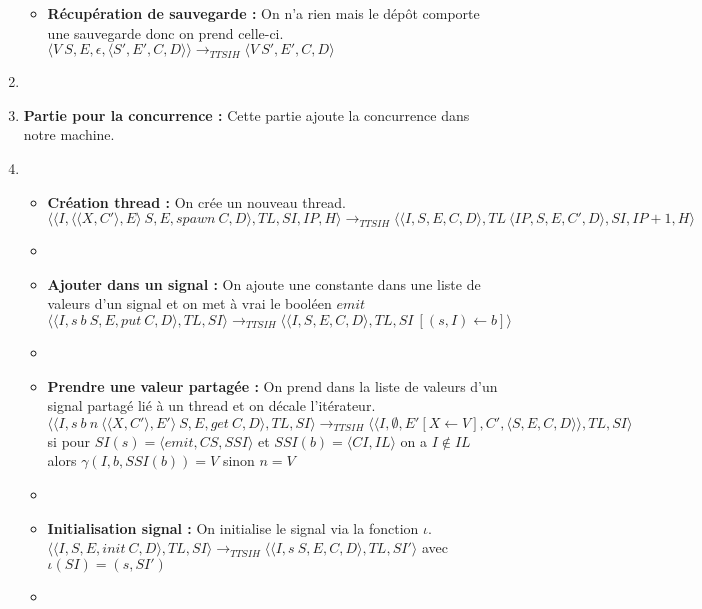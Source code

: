 \documentclass[10pt,a4paper]{report}
\begin{document}
\begin{enumerate}
\begin{itemize}
			\item[] \textbf{Récupération de sauvegarde :}  On n'a rien mais le dépôt comporte une sauvegarde donc on prend celle-ci.
			\smallbreak  
			$\langle V~S,E,\epsilon,\langle S',E',C,D\rangle\rangle
			\longrightarrow_{TTSIH} 
			\langle V~S',E',C,D\rangle$
		\end{itemize}
		\item[]
		
		
		
		\item[] \textbf{Partie pour la concurrence :} Cette partie ajoute la concurrence dans notre machine. 
		\item[]
		\begin{itemize}
			\item[]  \textbf{Création thread :} On crée un nouveau thread.
			\smallbreak 
			$\langle\langle I,\langle\langle X,C'\rangle, E\rangle~S,E,spawn~C,D\rangle,TL,SI,IP,H\rangle 
			\longrightarrow_{TTSIH} 
			\langle\langle I,S,E,C,D\rangle,TL~\langle IP,S,E,C',D\rangle,SI,IP+1,H\rangle$
			\item[]
			
			\item[] \textbf{Ajouter dans un signal :} On ajoute une constante dans une liste de valeurs d'un signal et on met à vrai le booléen $emit$
			\smallbreak
			$\langle\langle I,s~b~S,E,put~C,D\rangle,TL,SI\rangle
			\longrightarrow_{TTSIH} 
			\langle\langle I,S,E,C,D\rangle,TL,SI~[(s,I) \leftarrow b]\rangle$ 
			\item[]
			
			\item[] \textbf{Prendre une valeur partagée :} On prend dans la liste de valeurs d'un signal partagé lié à un thread et on décale l'itérateur.
			\smallbreak
			$\langle\langle I,s~b~n~\langle\langle X,C'\rangle,E'\rangle~S,E,get~C,D\rangle,TL,SI\rangle 
			\longrightarrow_{TTSIH} 
			\langle\langle I,\emptyset,E'[X \leftarrow V],C',\langle S,E,C,D\rangle\rangle,TL,SI\rangle$
			\\ si pour $SI(s) = \langle emit,CS,SSI\rangle$ et $SSI(b) = \langle CI,IL\rangle$ on a $I \notin IL$ alors $\gamma(I,b,SSI(b)) = V$ sinon $n = V$
			\item[]
			
			\item[] \textbf{Initialisation signal :} On initialise le signal via la fonction $\iota$.
			\smallbreak 
			$\langle\langle I,S,E,init~C,D\rangle,TL,SI\rangle 
			\longrightarrow_{TTSIH}
			\langle\langle I,s~S,E,C,D\rangle,TL,SI'\rangle$
			avec $\iota(SI) = (s,SI')$
			\item[]	
			

\end{itemize}
\end{enumerate}
\end{document}
